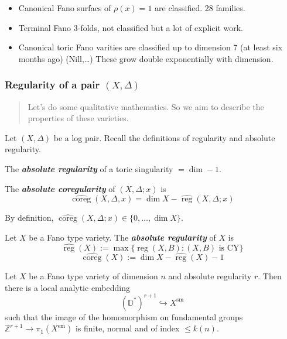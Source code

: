\begin{itemize}
	\item Canonical Fano surfacs of $\rho(x)=1$ are classified. 28 families.
	\item Terminal Fano 3-folds, not classified but a lot of explicit work.
	\item Canonical toric Fano varities are classified up to dimension 7 (at least six months ago) (Nill,…) These grow double exponentially with dimension.
\end{itemize}

\subsubsection{Regularity of a pair $(X,\Delta)$}

\begin{quotation}
	Let's do some qualitative mathematics. So we aim to describe the properties of these varieties.
\end{quotation}

Let $(X,\Delta)$ be a log pair. Recall the definitions of regularity and absolute regularity.

\begin{remark}
	The \textit{\textbf{absolute regularity}} of a toric singularity $= \dim -1$.
\end{remark}

\begin{defn}
	The \textit{\textbf{absolute coregularity}} of  $(X,\Delta ;x)$ is
	\[\hat{\operatorname{coreg}}(X,\Delta,x)=\dim X-\hat{\operatorname{reg}}(X,\Delta;x)\]
\end{defn}

By definition, $\hat{\operatorname{coreg}}(X,\Delta ;x)\in \{0,\ldots,\dim X\} $.

\begin{defn}
	Let $X$ be a Fano type variety. The \textit{\textbf{absolute regularity}} of $X$ is
	\[\hat{\operatorname{reg}}(X):=\max \{\operatorname{reg}(X,B):(X,B)\text{ is CY} \} \]
	\[\hat{\operatorname{coreg}}(X):=\dim X-\hat{\operatorname{reg}}(X)-1\]
\end{defn}

\begin{thm}[M,21]\leavevmode
	Let $X$ be a Fano type variety of dimension $n$ and absolute regularity $r$. Then there is a local analytic embedding
	\[(\mathbb{D}^{*} )^{r+1} \hookrightarrow X^{\operatorname{sm}}\]
	such that the image of the homomorphism on fundamental groups $\mathbb{Z}^{r+1} \to \pi_{1}(X^{\operatorname{em}}) $ is finite, normal and of index $\leq k(n)$.
\end{thm}

